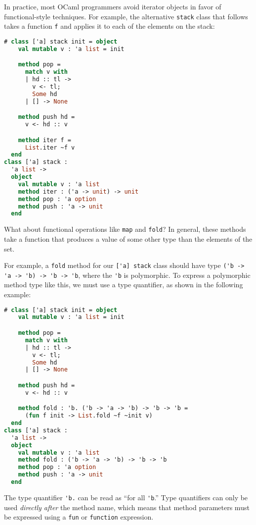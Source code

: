 In practice, most OCaml programmers avoid iterator objects in favor of
functional-style techniques. For example, the alternative
\passthrough{\lstinline!stack!} class that follows takes a function
\passthrough{\lstinline!f!} and applies it to each of the elements on
the stack: 

\begin{lstlisting}[language=Caml]
# class ['a] stack init = object
    val mutable v : 'a list = init

    method pop =
      match v with
      | hd :: tl ->
        v <- tl;
        Some hd
      | [] -> None

    method push hd =
      v <- hd :: v

    method iter f =
      List.iter ~f v
  end
class ['a] stack :
  'a list ->
  object
    val mutable v : 'a list
    method iter : ('a -> unit) -> unit
    method pop : 'a option
    method push : 'a -> unit
  end
\end{lstlisting}

What about functional operations like \passthrough{\lstinline!map!} and
\passthrough{\lstinline!fold!}? In general, these methods take a
function that produces a value of some other type than the elements of
the set.

For example, a \passthrough{\lstinline!fold!} method for our
\passthrough{\lstinline!['a] stack!} class should have type
\passthrough{\lstinline!('b -> 'a -> 'b) -> 'b -> 'b!}, where the
\passthrough{\lstinline!'b!} is polymorphic. To express a polymorphic
method type like this, we must use a type quantifier, as shown in the
following example:

\begin{lstlisting}[language=Caml]
# class ['a] stack init = object
    val mutable v : 'a list = init

    method pop =
      match v with
      | hd :: tl ->
        v <- tl;
        Some hd
      | [] -> None

    method push hd =
      v <- hd :: v

    method fold : 'b. ('b -> 'a -> 'b) -> 'b -> 'b =
      (fun f init -> List.fold ~f ~init v)
  end
class ['a] stack :
  'a list ->
  object
    val mutable v : 'a list
    method fold : ('b -> 'a -> 'b) -> 'b -> 'b
    method pop : 'a option
    method push : 'a -> unit
  end
\end{lstlisting}

The type quantifier \passthrough{\lstinline!'b.!} can be read as ``for
all \passthrough{\lstinline!'b!}.'' Type quantifiers can only be used
\emph{directly after} the method name, which means that method
parameters must be expressed using a \passthrough{\lstinline!fun!} or
\passthrough{\lstinline!function!} expression.

